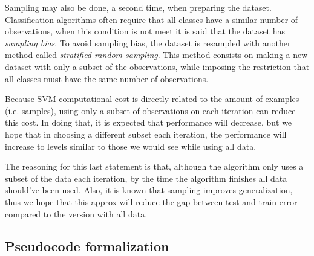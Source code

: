 Sampling may also be done, a second time, when preparing the dataset. Clas\-si\-fi\-cation algorithms often require that all classes have a similar number of ob\-ser\-va\-tions, when this condition is not meet it is said that the dataset has \emph{sampling bias}. To avoid sampling bias, the dataset is resampled with another method called \emph{stratified random sampling}. This method consists on making a new dataset with only a subset of the observations, while imposing the restriction that all classes must have the same number of observations.

Because SVM computational cost is directly related to the amount of examples (i.e. samples), using only a subset of observations on each iteration can reduce this cost. In doing that, it is expected that performance will decrease, but we hope that in choosing a different subset each iteration, the performance will increase to levels similar to those we would see while using all data.

The reasoning for this last statement is that, although the algorithm only uses a subset of the data each iteration, by the time the algorithm finishes all data should've been used. Also, it is known that sampling improves generalization, thus we hope that this approx will reduce the gap between test and train error compared to the version with all data.

\subsection{Pseudocode formalization}

